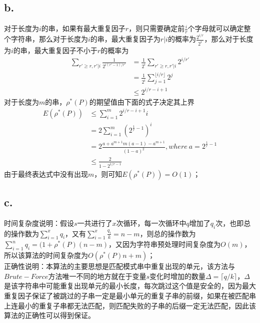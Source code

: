 \documentclass{article}
\begin{document}
  	\subsection*{b.}
  		 对于长度为$i$的串，如果有最大重复因子$r$，则只需要确定前$\frac{i}{r}$个字母就可以确定整个字符串，那么对于长度为$i$的串，最大重复因子为$r|i$的概率为$\frac{2^{i/r}}{2^i}$，那么对于长度为$i$的串，最大重复因子不小于$r$的概率为
  		 \begin{align*}
	  		 \sum_{r'\geq r,r'|i}\frac{1}{2^{i(r'-1)/r'}} &= \frac{1}{2^i}\sum_{r'\geq r,r'|i}2^{i/r'} \\
	  		 &= \frac{1}{2^i} \sum_{j=1}^{\lfloor i/r\rfloor}2^j \\
	  		 &\leq 2^{i/r-i+1}
  		 \end{align*}
  		 对于长度为$m$的串，$\rho^*(P)$的期望值由下面的式子决定其上界
  		 \begin{align*}
	  		 E(\rho^*(P)) &\leq \sum_{i=1}^{m}2^{i/r-i+1}i \\
	  		 &= 2\sum_{i=1}^{m}(2^{\frac{1}{r}-1})^i \\
	  		 &= 2\frac{a+a^{m+1}m(a-1)-a^{m+1}}{(1-a)^2} ,where \:a=2^{\frac{1}{r}-1}\\
	  		 &\leq \frac{2}{1-2^{1/r-1}}
  		 \end{align*}
  		 由于最终表达式中没有出现$m$，则可知$E(\rho^*(P))=O(1)$；
  	\subsection*{c.}
  		时间复杂度说明：假设$s$一共进行了$x$次循环，每一次循环中$q$增加了$q_i$次，也即总的操作数为$\sum_{i=1}^{x}q_i$，又有$\sum_{i=1}^x\frac{q_i}{k}=n-m$，则总的操作数为$\sum_{i=1}^{n}q_i=(1+\rho^*(P)(n-m)$，又因为字符串预处理时间复杂度为$O(m)$，所以该算法的时间复杂度为$O(\rho^*(P)n+m)$；\\
  		正确性说明：本算法的主要思想是匹配模式串中重复出现的单元，该方法与$Brute-Force$方法唯一不同的地方就在于变量$s$变化时增加的数量$\Delta=\lceil q/k \rceil$，$\Delta$是该字符串中可能重复出现单元的最小长度，每次跳过这个值是安全的，因为最大重复因子保证了被跳过的子串一定是最小单元的重复子串的前缀，如果在被匹配串上连最小的重复子串都无法匹配，则匹配失败的子串的后缀一定无法匹配，因此该算法的正确性可以得到保证。
\end{document}
